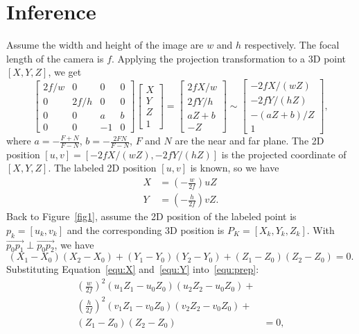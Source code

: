 \documentclass[a4paper]{article}
\begin{document}
\section{Inference}
\label{sec:inference}
Assume the width and height of the image are $w$ and $h$ respectively. The focal length of the camera is $f$.
Applying the projection transformation to a 3D point $[X,Y,Z]$, we get
\begin{equation}
 \begin{bmatrix}2f/w & 0 & 0 & 0 \\0 & 2f/h & 0 & 0\\ 0 & 0 & a & b\\ 0 & 0 & -1 & 0 \end{bmatrix}  \begin{bmatrix}X\\Y\\Z\\1 \end{bmatrix} =
 \begin{bmatrix} 2fX/w\\2fY/h\\aZ+b\\-Z \end{bmatrix} \sim \begin{bmatrix} -2fX/(wZ)\\-2fY/(hZ)\\-(aZ+b)/Z\\1 \end{bmatrix},
\end{equation}
where $a = -\frac{F+N}{F-N}$, $b = -\frac{2FN}{F-N}$, $F$ and $N$ are the near and far plane.
The 2D position $[u,v]=[-2fX/(wZ), -2fY/(hZ)]$ is the projected coordinate of $[X,Y,Z]$.
The labeled 2D position $[u,v]$ is known, so we have
\begin{align}
X&=(-\frac{w}{2f})uZ \label{equ:X}\\
Y&=(-\frac{h}{2f})vZ\label{equ:Y}.
\end{align}
Back to Figure~\ref{fig1}, assume the 2D position of the labeled point is $p_k=[u_k,v_k]$ and the corresponding 3D position is $P_K=[X_k,Y_k,Z_k]$.
With $\overrightarrow{p_0p_1} \perp \overrightarrow{p_0p_2}$, we have
\begin{equation}
(X_1-X_0)(X_2-X_0)+(Y_1-Y_0)(Y_2-Y_0)+(Z_1-Z_0)(Z_2-Z_0)=0\label{equ:prep}.
\end{equation}
Substituting Equation~\ref{equ:X} and~\ref{equ:Y} into~\ref{equ:prep}:
\begin{align}
(\frac{w}{2f})^2(u_1Z_1-u_0Z_0)(u_2Z_2-u_0Z_0)+ & \nonumber\\
(\frac{h}{2f})^2(v_1Z_1-v_0Z_0)(v_2Z_2-v_0Z_0)+ & \nonumber\\
(Z_1-Z_0)(Z_2-Z_0) &=0,
\end{align}
\end{document}
